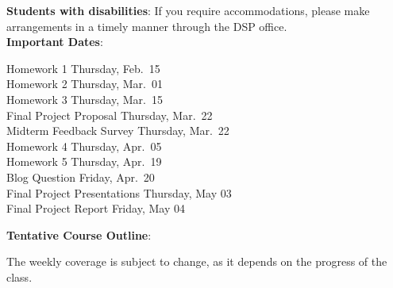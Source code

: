 \documentclass[11pt]{article}
\begin{document}
\textbf{Students with disabilities}: If you require accommodations, please make
arrangements in a timely manner through the DSP office.\\

\noindent\textbf{Important Dates}:
\begin{center} \begin{minipage}{5in}
\begin{flushleft}
Homework 1 \dotfill Thursday, Feb.~15\\
Homework 2 \dotfill Thursday, Mar.~01\\
Homework 3 \dotfill Thursday, Mar.~15\\
Final Project Proposal \dotfill Thursday, Mar.~22\\
Midterm Feedback Survey \dotfill Thursday, Mar.~22\\
Homework 4 \dotfill Thursday, Apr.~05\\
Homework 5 \dotfill Thursday, Apr.~19\\
Blog Question \dotfill Friday, Apr.~20\\
Final Project Presentations \dotfill Thursday, May 03\\
Final Project Report \dotfill Friday, May 04\\
\end{flushleft}
\end{minipage}
\end{center}

\newpage

\textbf {\large Tentative Course Outline}:

The weekly coverage is subject to change, as it depends on the progress of the
class.
\end{document}
